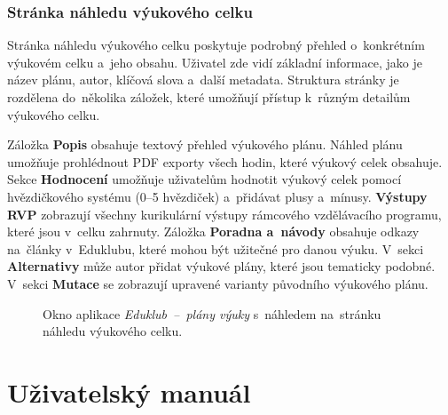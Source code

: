 \documentclass[male,czech,api_bc]{kitheses}
\begin{document}
\subsubsection{Stránka náhledu výukového celku}

Stránka náhledu výukového celku poskytuje podrobný přehled o~konkrétním výukovém celku a~jeho obsahu. Uživatel zde vidí základní informace, jako je název plánu, autor, klíčová slova a~další metadata. Struktura stránky je rozdělena do~několika záložek, které umožňují přístup k~různým detailům výukového celku.

Záložka \textbf{Popis} obsahuje textový přehled výukového plánu. Náhled plánu umožňuje prohlédnout PDF exporty všech hodin, které výukový celek obsahuje. Sekce \textbf{Hodnocení} umožňuje uživatelům hodnotit výukový celek pomocí hvězdičkového systému (0--5 hvězdiček) a~přidávat plusy a~mínusy. \textbf{Výstupy RVP} zobrazují všechny kurikulární výstupy rámcového vzdělávacího programu, které jsou v~celku zahrnuty. Záložka \textbf{Poradna a~návody} obsahuje odkazy na~články v~Eduklubu, které mohou být užitečné pro danou výuku. V~sekci \textbf{Alternativy} může autor přidat výukové plány, které jsou tematicky podobné. V~sekci \textbf{Mutace} se zobrazují upravené varianty původního výukového plánu.

\begin{figure}[H]
	\centering
	\caption{Okno aplikace \textit{Eduklub~--~plány výuky} s~náhledem na~stránku náhledu výukového celku.}
	\label{fig:eduklub-4}
\end{figure}

\section{Uživatelský manuál}
\end{document}
